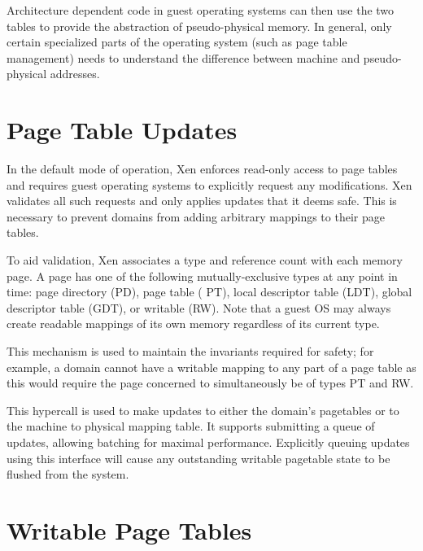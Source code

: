 \documentclass[11pt,twoside,final,openright,a4paper]{report}
\newcommand{\hypercall}[1]{\vspace{2mm}{\sf #1}}
\begin{document}
Architecture dependent code in guest operating systems can then use
the two tables to provide the abstraction of pseudo-physical memory.
In general, only certain specialized parts of the operating system
(such as page table management) needs to understand the difference
between machine and pseudo-physical addresses.


\section{Page Table Updates}

In the default mode of operation, Xen enforces read-only access to
page tables and requires guest operating systems to explicitly request
any modifications.  Xen validates all such requests and only applies
updates that it deems safe.  This is necessary to prevent domains from
adding arbitrary mappings to their page tables.

To aid validation, Xen associates a type and reference count with each
memory page. A page has one of the following mutually-exclusive types
at any point in time: page directory ({\sf PD}), page table ({\sf
  PT}), local descriptor table ({\sf LDT}), global descriptor table
({\sf GDT}), or writable ({\sf RW}). Note that a guest OS may always
create readable mappings of its own memory regardless of its current
type.

This mechanism is used to maintain the invariants required for safety;
for example, a domain cannot have a writable mapping to any part of a
page table as this would require the page concerned to simultaneously
be of types {\sf PT} and {\sf RW}.

\hypercall{mmu\_update(mmu\_update\_t *req, int count, int *success\_count, domid\_t domid)}

This hypercall is used to make updates to either the domain's
pagetables or to the machine to physical mapping table.  It supports
submitting a queue of updates, allowing batching for maximal
performance.  Explicitly queuing updates using this interface will
cause any outstanding writable pagetable state to be flushed from the
system.

\section{Writable Page Tables}
\end{document}
